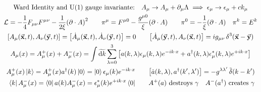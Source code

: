 \begin{gather*}
        \text{Ward Identity and U(1) gauge invariante:}\quad
        A_\mu \to A_\mu + \partial_\mu\Lambda
        \implies
        \epsilon_\mu \to \epsilon_\mu + ck_\mu
        \\
        \Lc = -\frac{1}{4}F_{\mu\nu}F^{\mu\nu} - \frac{1}{2\xi}\qty(\partial\cdot A)^2
        \qquad
        \pi^\mu = F^{\mu0} - \frac{g^{\mu0}}{\xi}\qty(\partial\cdot A)
        \qquad
        \pi^0 = -\frac{1}{\xi}\qty(\partial\cdot A)
        \quad
        \pi^k = E^k
        \\
        \comm{A_\mu(\va{x},t)}{A_\nu(\va{y},t)}
        = \comm{\dot{A}_\mu(\va{x},t)}{\dot{A}_\nu(\va{y},t)}
        = 0
        \qquad
        \comm{\dot{A}_\mu(\va{y},t)}{A_\nu(\va{x},t)}
        = ig_{\mu\nu}\Ddelta[3](\va{x}-\va{y})
        \\
        A_\mu(x)
        = A_\mu^+(x) + A_\mu^-(x)
        = \int\Tdd{k} \sum_{\lambda=0}^3\qty[a(k,\lambda)\epsilon_\mu(k,\lambda)e^{-ik\cdot x} + a^\dagger(k,\lambda)\epsilon^*_\mu(k,\lambda)e^{+ik\cdot x}]
        \\
        \begin{aligned}
                A_\mu^+(x)\ket{k} = A_\mu^+(x)a^\dagger(k)\ket{0} = \ket{0}\epsilon_\mu(k)e^{-ik\cdot x}
                &\qquad
                \comm{\dot{a}(k,\lambda)}{a^\dagger(k',\lambda')}
                = - g^{\lambda\lambda'}\Tdelta(k-k')
                \\
                \bra{k}A_\mu^-(x) = \bra{0}a(k)A_\mu^-(x) = \epsilon^*_\mu(k)e^{+ik\cdot x}\bra{0}
                &\qquad
                A^+(a) \text{ destroys } \ce{\gamma}
                \quad
                A^-(a^\dagger) \text{ creates } \ce{\gamma}
        \end{aligned}
\end{gather*}

